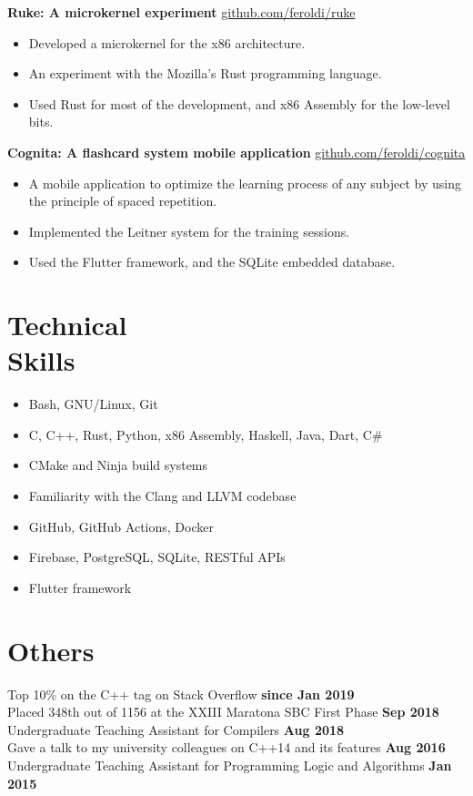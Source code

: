 \documentclass[margin,line]{resume}
\begin{document}
\begin{resume}
    \textbf{Ruke: A microkernel experiment} \hfill \url{github.com/feroldi/ruke}
    \begin{itemize}
        \item Developed a microkernel for the x86 architecture.
        \item An experiment with the Mozilla's Rust programming language.
        \item Used Rust for most of the development, and x86 Assembly for the low-level bits.
    \end{itemize}

    \textbf{Cognita: A flashcard system mobile application} \hfill \url{github.com/feroldi/cognita}
    \begin{itemize}
        \item A mobile application to optimize the learning process of any subject by using the principle of spaced repetition.
        \item Implemented the Leitner system for the training sessions.
        \item Used the Flutter framework, and the SQLite embedded database.
    \end{itemize}

    \break

    \section{\mysidestyle Technical\\Skills}

    \begin{itemize}
        \item Bash, GNU/Linux, Git
        \item C, C++, Rust, Python, x86 Assembly, Haskell, Java, Dart, C\#
        \item CMake and Ninja build systems
        \item Familiarity with the Clang and LLVM codebase
        \item GitHub, GitHub Actions, Docker
        \item Firebase, PostgreSQL, SQLite, RESTful APIs
        \item Flutter framework
    \end{itemize}

    \section{\mysidestyle Others}

    Top 10\% on the C++ tag on Stack Overflow \hfill \textbf{since Jan 2019}\\
    Placed 348th out of 1156 at the XXIII Maratona SBC First Phase \hfill \textbf{Sep 2018}\\
    Undergraduate Teaching Assistant for Compilers \hfill \textbf{Aug 2018}\\
    Gave a talk to my university colleagues on C++14 and its features \hfill \textbf{Aug 2016}\\
    Undergraduate Teaching Assistant for Programming Logic and Algorithms \hfill \textbf{Jan 2015}\\

\end{resume}
\end{document}
